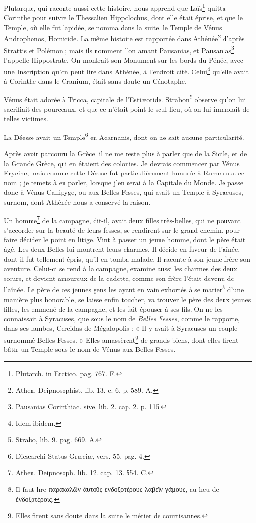 \documentclass[a4paper, 18pt, oneside]{article}
\begin{document}
Plutarque, qui raconte aussi cette histoire, nous apprend que Laïs\footnote{Plutarch. in Erotico. pag. 767. F.} quitta Corinthe pour suivre le Thessalien Hippolochus, dont elle était éprise, et que le Temple, où elle fut lapidée, se nomma dans la suite, le Temple de Vénus Androphonos, Homicide. La même histoire est rapportée dans Athénée\footnote{Athen. Deipnosophist. lib. 13. c. 6. p. 589. A.} d'après Strattis et Polémon ; mais ils nomment l'on amant Pausanias, et Pausanias\footnote{Pausanias Corinthiac. sive, lib. 2. cap. 2. p. 115.} l'appelle Hippostrate. On montrait son Monument sur les bords du Pénée, avec une Inscription qu'on peut lire dans Athénée, à l'endroit cité. Celui\footnote{Idem ibidem.} qu'elle avait à Corinthe dans le Cranium, était sans doute un Cénotaphe.

Vénus était adorée à Tricca, capitale de l'Estiæotide. Strabon\footnote{Strabo, lib. 9. pag. 669. A.} observe qu'on lui sacrifiait des pourceaux, et que ce n'était point le seul lieu, où on lui immolait de telles victimes.

La Déesse avait un Temple\footnote{Dicæarchi Status Græciæ, vers. 55. pag. 4.} en Acarnanie, dont on ne sait aucune particularité.

Après avoir parcouru la Grèce, il ne me reste plus à parler que de la Sicile, et de la Grande Grèce, qui en étaient des colonies. Je devrais commencer par Vénus Erycine, mais comme cette Déesse fut particulièrement honorée à Rome sous ce nom ; je remets à en parler, lorsque j'en serai à la Capitale du Monde. Je passe donc à Vénus Callipyge, ou aux Belles Fesses, qui avait un Temple à Syracuses, surnom, dont Athénée nous a conservé la raison.

Un homme\footnote{Athen. Deipnosoph. lib. 12. cap. 13. 554. C.} de la campagne, dit-il, avait deux filles très-belles, qui ne pouvant s'accorder sur la beauté de leurs fesses, se rendirent sur le grand chemin, pour faire décider le point en litige. Vint à passer un jeune homme, dont le père était âgé. Les deux Belles lui montrent leurs charmes. Il décide en faveur de l'aînée, dont il fut tellement épris, qu'il en tomba malade. Il raconte à son jeune frère son aventure. Celui-ci se rend à la campagne, examine aussi les charmes des deux sœurs, et devient amoureux de la cadette, comme son frère l'était devenu de l'aînée. Le père de ces jeunes gens les ayant en vain exhortés à se marier\footnote{Il faut lire παρακαλῶν ἀυτοῦς ενδοξοτέρους λαβεῖν γάμους, au lieu de ἐνδοξοτέροις.} d'une manière plus honorable, se laisse enfin toucher, va trouver le père des deux jeunes filles, les emmené de la campagne, et les fait épouser à ses fils. On ne les connaissait à Syracuses, que sous le nom de \emph{Belles Fesses}, comme le rapporte, dans ses Iambes, Cercidas de Mégalopolis : « Il y avait à Syracuses un couple surnommé Belles Fesses. » Elles amassèrent\footnote{Elles firent sans doute dans la suite le métier de courtisannes.} de grands biens, dont elles firent bâtir un Temple sous le nom de Vénus aux Belles Fesses.
\end{document}
